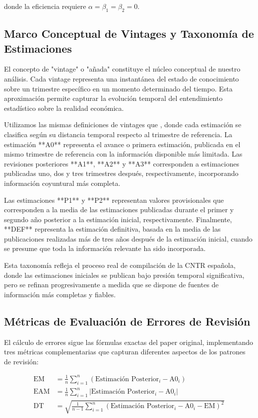 \documentclass{article}
\begin{document}
donde la eficiencia requiere $\alpha = \beta_1 = \beta_2 = 0$.

\subsection{Marco Conceptual de Vintages y Taxonomía de Estimaciones}

El concepto de "vintage" o "añada" constituye el núcleo conceptual de nuestro análisis. Cada vintage representa una instantánea del estado de conocimiento sobre un trimestre específico en un momento determinado del tiempo. Esta aproximación permite capturar la evolución temporal del entendimiento estadístico sobre la realidad económica.

Utilizamos las mismas definiciones de vintages que \citet{pavia2017}, donde cada estimación se clasifica según su distancia temporal respecto al trimestre de referencia. La estimación **A0** representa el avance o primera estimación, publicada en el mismo trimestre de referencia con la información disponible más limitada. Las revisiones posteriores **A1**, **A2** y **A3** corresponden a estimaciones publicadas uno, dos y tres trimestres después, respectivamente, incorporando información coyuntural más completa.

Las estimaciones **P1** y **P2** representan valores provisionales que corresponden a la media de las estimaciones publicadas durante el primer y segundo año posterior a la estimación inicial, respectivamente. Finalmente, **DEF** representa la estimación definitiva, basada en la media de las publicaciones realizadas más de tres años después de la estimación inicial, cuando se presume que toda la información relevante ha sido incorporada.

Esta taxonomía refleja el proceso real de compilación de la CNTR española, donde las estimaciones iniciales se publican bajo presión temporal significativa, pero se refinan progresivamente a medida que se dispone de fuentes de información más completas y fiables.

\subsection{Métricas de Evaluación de Errores de Revisión}

El cálculo de errores sigue las fórmulas exactas del paper original, implementando tres métricas complementarias que capturan diferentes aspectos de los patrones de revisión:

\begin{align}
\text{EM} &= \frac{1}{n}\sum_{i=1}^{n}(\text{Estimación Posterior}_i - \text{A0}_i) \label{eq:em}\\
\text{EAM} &= \frac{1}{n}\sum_{i=1}^{n}|\text{Estimación Posterior}_i - \text{A0}_i| \label{eq:eam}\\
\text{DT} &= \sqrt{\frac{1}{n-1}\sum_{i=1}^{n}(\text{Estimación Posterior}_i - \text{A0}_i - \text{EM})^2} \label{eq:dt}
\end{align}
\end{document}
